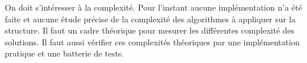 \documentclass[a4paper]{article}
\begin{document}
On doit s'intéresser à la complexité. Pour l'instant aucune implémentation n'a
été faite et aucune étude précise de la complexité des algorithmes à appliquer
sur la structure. Il faut un cadre théorique pour mesurer les différentes
complexité des solutions. Il faut aussi vérifier ces complexités théoriques par
une implémentation pratique et une batterie de tests. 

\printnoidxglossary[sort=def]

 
\end{document}
